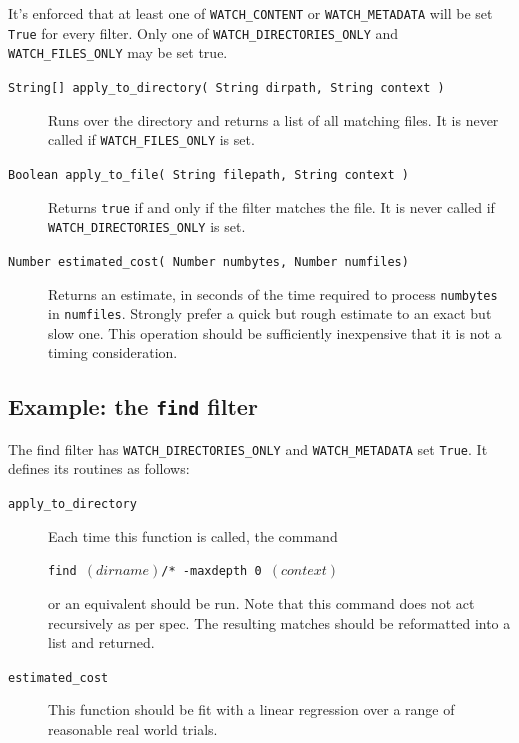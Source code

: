 \documentclass[a4paper]{report}
\newcommand{\inlinecode}{\texttt}
\begin{document}
It's enforced that at least one of \inlinecode{WATCH\_CONTENT} or \inlinecode{WATCH\_METADATA} will be set \inlinecode{True} for every filter. Only one of \inlinecode{WATCH\_DIRECTORIES\_ONLY} and \inlinecode{WATCH\_FILES\_ONLY} may be set true.

\begin{description}
\item[\inlinecode{String[] apply\_to\_directory( String dirpath, String context )}] Runs over the directory and returns a list of all matching files. It is never called if \inlinecode{WATCH\_FILES\_ONLY} is set.
\item[\inlinecode{Boolean apply\_to\_file( String filepath, String context )}] Returns \inlinecode{true} if and only if the filter matches the file. It is never called if \inlinecode{WATCH\_DIRECTORIES\_ONLY} is set.
\item[\inlinecode{Number estimated\_cost( Number numbytes, Number numfiles)}] Returns an estimate, in seconds of the time required to process \inlinecode{numbytes} in \inlinecode{numfiles}. Strongly prefer a quick but rough estimate to an exact but slow one. This operation should be sufficiently inexpensive that it is not a timing consideration.
\end{description}

\subsection{Example: the \inlinecode{find} filter}

The find filter has \inlinecode{WATCH\_DIRECTORIES\_ONLY} and \inlinecode{WATCH\_METADATA} set \inlinecode{True}. It defines its  routines as follows:

\begin{description}
\item[\inlinecode{apply\_to\_directory}]

Each time this function is called, the command

\inlinecode{find $(dirname)$/* -maxdepth 0 $(context)$}

or an equivalent should be run. Note that this command does not act recursively as per spec. The resulting matches should be reformatted into a list and returned.

\item[\inlinecode{estimated\_cost}] This function should be fit with a linear regression over a range of reasonable real world trials.

\end{description}
\end{document}

